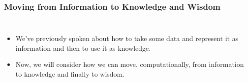 \documentclass{beamer}
\begin{document}
\begin{frame}
\frametitle{Moving from Information to Knowledge and Wisdom}
\begin{columns}



\begin{itemize}
  \item We've previously spoken about how to take some data and represent it as
  information and then to use it as knowledge.
  \item Now, we will consider how we can move, computationally, from information
  to knowledge and finally to wisdom.
\end{itemize}

\end{columns}

\end{frame}
\end{document}
